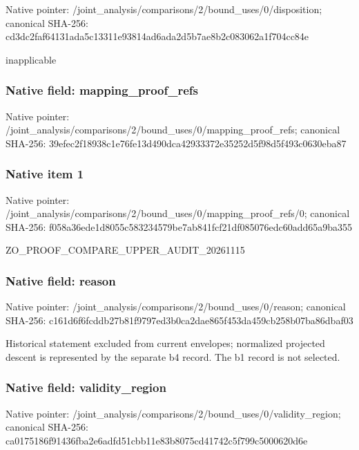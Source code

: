 \documentclass[10pt,a4paper]{article}
\begin{document}
Native pointer: /joint\_analysis/comparis\allowbreak{}ons/2/bound\_uses/0/dispo\allowbreak{}sition; canonical SHA-256: cd3dc2faf64131ada5c13311\allowbreak{}e93814ad6ada2d5b7ae8b2c0\allowbreak{}83062a1f704cc84e


inapplicable


\subsubsection{Native field: mapping\_proof\_refs}


Native pointer: /joint\_analysis/comparis\allowbreak{}ons/2/bound\_uses/0/mappi\allowbreak{}ng\_proof\_refs; canonical SHA-256: 39efec2f18938c1e76fe13d4\allowbreak{}90dca42933372e35252d5f98\allowbreak{}d5f493c0630eba87



\subsubsection{Native item 1}


Native pointer: /joint\_analysis/comparis\allowbreak{}ons/2/bound\_uses/0/mappi\allowbreak{}ng\_proof\_refs/0; canonical SHA-256: f058a36ede1d8055c5832345\allowbreak{}79be7ab841fcf21df085076e\allowbreak{}dc60add65a9ba355


ZO\_PROOF\_COMPARE\_UPPER\_AUDIT\_20261115


\subsubsection{Native field: reason}


Native pointer: /joint\_analysis/comparis\allowbreak{}ons/2/bound\_uses/0/reaso\allowbreak{}n; canonical SHA-256: c161d6f6fcddb27b81f9797e\allowbreak{}d3b0ca2dae865f453da459cb\allowbreak{}258b07ba86dbaf03


Historical statement excluded from current envelopes; normalized projected descent is represented by the separate b4 record. The b1 record is not selected.


\subsubsection{Native field: validity\_region}


Native pointer: /joint\_analysis/comparis\allowbreak{}ons/2/bound\_uses/0/valid\allowbreak{}ity\_region; canonical SHA-256: ca0175186f91436fba2e6adf\allowbreak{}d51cbb11e83b8075cd41742c\allowbreak{}5f799c5000620d6e
\end{document}
